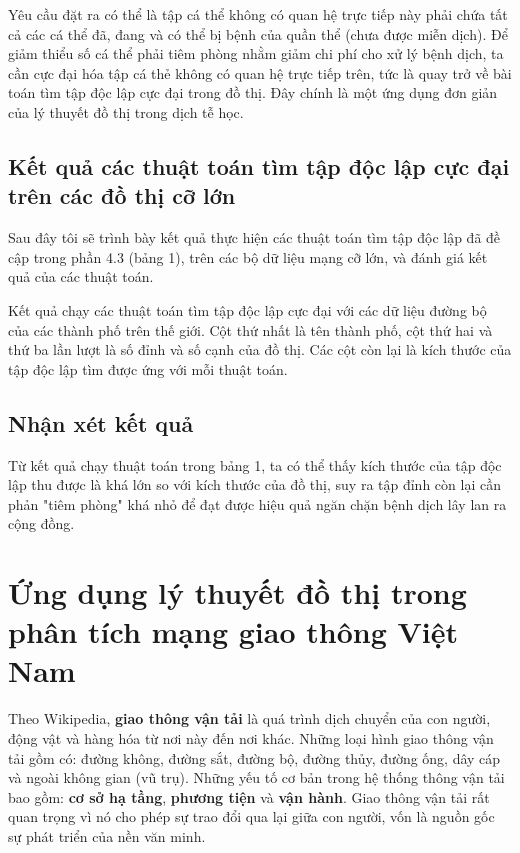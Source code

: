 \documentclass[14pt, oneside, a4paper, openany]{scrartcl}
\begin{document}
Yêu cầu đặt ra có thể là tập cá thể không có quan hệ trực tiếp này phải chứa tất cả các cá thể đã, đang và có thể bị bệnh của quần thể (chưa được miễn dịch). Để giảm thiểu số cá thể phải tiêm phòng nhằm giảm chi phí cho xử lý bệnh dịch, ta cần cực đại hóa tập cá thẻ không có quan hệ trực tiếp trên, tức là quay trở về bài toán tìm tập độc lập cực đại trong đồ thị.
Đây chính là một ứng dụng đơn giản của lý thuyết đồ thị trong dịch tễ học.

\subsection{Kết quả các thuật toán tìm tập độc lập cực đại trên các đồ thị cỡ lớn}
Sau đây tôi sẽ trình bày kết quả thực hiện các thuật toán tìm tập độc lập đã đề cập trong phần 4.3 (bảng 1), trên các bộ dữ liệu mạng cỡ lớn, và đánh giá kết quả của các thuật toán.

\begin{table}[!h]
	\caption[độ chính xác của các phương pháp trên các dữ liệu kiểm thử]{Kết quả chạy các thuật toán tìm tập độc lập cực đại với các dữ liệu đường bộ của các thành phố trên thế giới. Cột thứ nhất là tên thành phố, cột thứ hai và thứ ba lần lượt là số đỉnh và số cạnh của đồ thị. Các cột còn lại là kích thước của tập độc lập tìm được ứng với mỗi thuật toán.}
	\centering
\end{table}

\subsection{Nhận xét kết quả}
Từ kết quả chạy thuật toán trong bảng 1, ta có thể thấy kích thước của tập độc lập thu được là khá lớn so với kích thước của đồ thị, suy ra tập đỉnh còn lại cần phản "tiêm phòng" khá nhỏ để đạt được hiệu quả ngăn chặn bệnh dịch lây lan ra cộng đồng.

\newpage
\section{Ứng dụng lý thuyết đồ thị trong phân tích mạng giao thông Việt Nam}
Theo Wikipedia, \textbf{giao thông vận tải}  là quá trình dịch chuyển của con người, động vật và hàng hóa từ nơi này đến nơi khác. Những loại hình giao thông vận tải gồm có: đường không, đường sắt, đường bộ, đường thủy, đường ống, dây cáp và ngoài không gian (vũ trụ). Những yếu tố cơ bản trong hệ thống thông vận tải bao gồm: \textbf{cơ sở hạ tầng}, \textbf{phương tiện} và \textbf{vận hành}. Giao thông vận tải rất quan trọng vì nó cho phép sự trao đổi qua lại giữa con người, vốn là nguồn gốc sự phát triển của nền văn minh.
\end{document}
